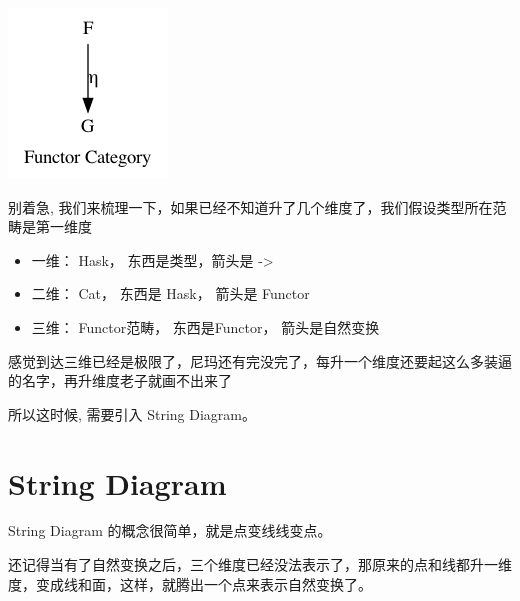 \documentclass[11pt]{tufte-book}
\begin{document}
\begin{center}
\includegraphics[width=.9\linewidth]{images/functor-category.png}
\end{center}

别着急, 我们来梳理一下，如果已经不知道升了几个维度了，我们假设类型所在范畴是第一维度
\begin{itemize}
\item 一维： Hask， 东西是类型，箭头是 ->
\item 二维： Cat， 东西是 Hask， 箭头是 Functor
\item 三维： Functor范畴， 东西是Functor， 箭头是自然变换
\end{itemize}

感觉到达三维已经是极限了，尼玛还有完没完了，每升一个维度还要起这么多装逼的名字，再升维度老子就画不出来了

所以这时候, 需要引入 String Diagram。

\chapter{String Diagram}
\label{sec:org050993a}

String Diagram 的概念很简单，就是点变线线变点。

还记得当有了自然变换之后，三个维度已经没法表示了，那原来的点和线都升一维度，变成线和面，这样，就腾出一个点来表示自然变换了。
\end{document}
